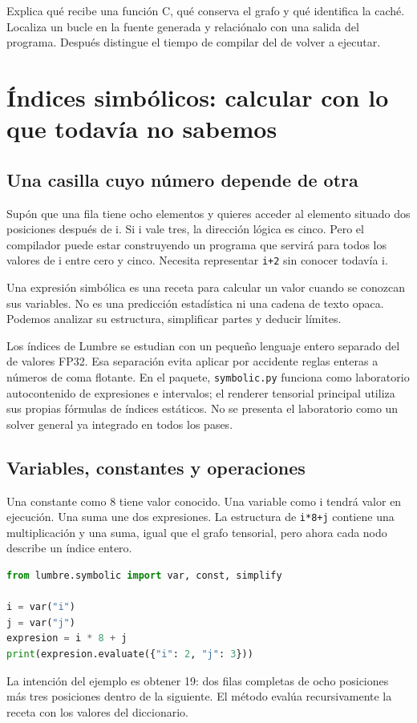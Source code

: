 \documentclass[12pt,a4paper,oneside]{report}
\begin{document}
\begin{comprueba}
Explica qué recibe una función C, qué conserva el grafo y qué identifica la caché. Localiza un bucle en la fuente generada y relaciónalo con una salida del programa. Después distingue el tiempo de compilar del de volver a ejecutar.

\end{comprueba}

\chapter{Índices simbólicos: calcular con lo que todavía no sabemos}
\label{ch:symbolic}
\section{Una casilla cuyo número depende de otra}
Supón que una fila tiene ocho elementos y quieres acceder al elemento situado dos posiciones después de i. Si i vale tres, la dirección lógica es cinco. Pero el compilador puede estar construyendo un programa que servirá para todos los valores de i entre cero y cinco. Necesita representar \texttt{i+2} sin conocer todavía i.

Una expresión simbólica es una receta para calcular un valor cuando se conozcan sus variables. No es una predicción estadística ni una cadena de texto opaca. Podemos analizar su estructura, simplificar partes y deducir límites.

Los índices de Lumbre se estudian con un pequeño lenguaje entero separado del de valores FP32. Esa separación evita aplicar por accidente reglas enteras a números de coma flotante. En el paquete, \texttt{symbolic.py} funciona como laboratorio autocontenido de expresiones e intervalos; el renderer tensorial principal utiliza sus propias fórmulas de índices estáticos. No se presenta el laboratorio como un solver general ya integrado en todos los pases.

\section{Variables, constantes y operaciones}
Una constante como 8 tiene valor conocido. Una variable como i tendrá valor en ejecución. Una suma une dos expresiones. La estructura de \texttt{i*8+j} contiene una multiplicación y una suma, igual que el grafo tensorial, pero ahora cada nodo describe un índice entero.

\begin{lstlisting}[language=Python]
from lumbre.symbolic import var, const, simplify

i = var("i")
j = var("j")
expresion = i * 8 + j
print(expresion.evaluate({"i": 2, "j": 3}))
\end{lstlisting}
La intención del ejemplo es obtener 19: dos filas completas de ocho posiciones más tres posiciones dentro de la siguiente. El método evalúa recursivamente la receta con los valores del diccionario.
\end{document}

